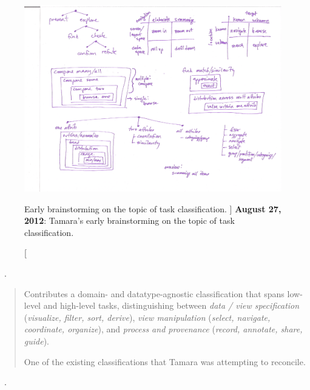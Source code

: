 \begin{figure}
	\centering
	\includegraphics[width=\textwidth]{figures/typology-12-08-27-TM.pdf}
	\caption
	[
	    Early brainstorming on the topic of task classification.
	]
	{
	    {\bf August 27, 2012}: Tamara's early brainstorming on the topic of task classification.
	}
	\centering
	\label{app:typology:fig:12-08-27}
\end{figure}


\begin{sloppypar}
~\cite{Heer2012}. \end{sloppypar}

\begin{quotation}
    Contributes a domain- and datatype-agnostic classification that spans low-level and high-level tasks, distinguishing between {\it data / view specification} ({\it visualize, filter, sort, derive}), {\it view manipulation} ({\it select, navigate, coordinate, organize}), and {\it process and provenance} ({\it record, annotate, share, guide}).
    
    One of the existing classifications that Tamara was attempting to reconcile.
\end{quotation}

\begin{sloppypar}
~\cite{Zhou1998}. \end{sloppypar}

